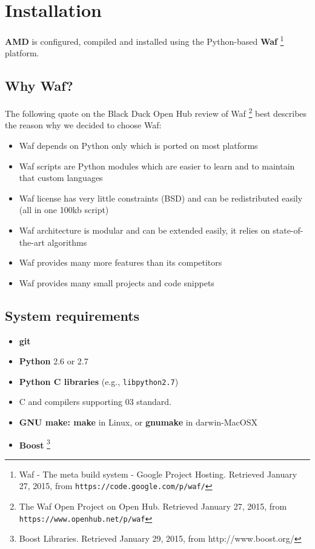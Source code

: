 \section{Installation}

\textbf{AMD} is configured, compiled and installed using the Python-based
\textbf{Waf}%
\footnote{Waf - The meta build system - Google Project Hosting. Retrieved
January 27, 2015, from \texttt{https://code.google.com/p/waf/}} platform.

\subsection{Why Waf?}

The following quote on the Black Duck Open Hub review of Waf%
\footnote{The Waf Open Project on Open Hub. Retrieved January 27, 2015, from
\texttt{https://www.openhub.net/p/waf}} best describes the reason why we
decided to choose Waf:
\begin{itemize}
\item Waf depends on Python only which is ported on most platforms 
\item Waf scripts are Python modules which are easier to learn and to maintain
that custom languages 
\item Waf license has very little constraints (BSD) and can be redistributed
easily (all in one 100kb script) 
\item Waf architecture is modular and can be extended easily, it relies
on state-of-the-art algorithms 
\item Waf provides many more features than its competitors 
\item Waf provides many small projects and code snippets
\end{itemize}

\subsection{System requirements}
\begin{itemize}
\item \textbf{git} 
\item \textbf{Python} 2.6 or 2.7
\item \textbf{Python C libraries }(e.g., \texttt{libpython2.7})
\item C and \Cpp{} compilers supporting \Cpp{}03 standard.
\item \textbf{GNU make: make }in Linux,\textbf{ }or\textbf{ gnumake }in
darwin-MacOSX 
\item \textbf{Boost}%
\footnote{Boost \Cpp{} Libraries. Retrieved January 29, 2015, from
http://www.boost.org/} 
\end{itemize}

